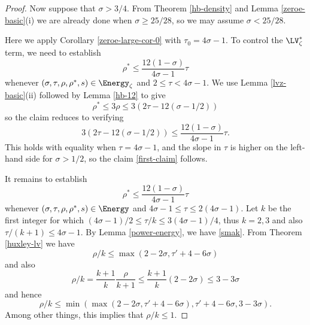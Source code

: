 \begin{proof}
Now suppose that $\sigma > 3/4$.  From Theorem \ref{hb-density} and Lemma \ref{zeroe-basic}(i) we are already done when $\sigma \geq 25/28$, so we may assume $\sigma < 25/28$.

Here we apply Corollary \ref{zeroe-large-cor-0} with $\tau_0 = 4\sigma-1$.  To control the $\LV^*_\zeta$ term, we need to establish
\begin{equation}\label{first-claim}
    \rho^* \leq \frac{12(1-\sigma)}{4\sigma-1} \tau
\end{equation}
whenever $(\sigma,\tau,\rho,\rho^*,s) \in \Energy_\zeta$ and $2 \leq \tau < 4\sigma-1$. We use Lemma \ref{lvz-basic}(ii) followed by Lemma \ref{hb-12} to give
$$ \rho^* \leq 3\rho \leq 3( 2\tau - 12 (\sigma-1/2) )$$
so the claim reduces to verifying
$$ 3( 2\tau - 12 (\sigma-1/2) ) \leq \frac{12(1-\sigma)}{4\sigma-1} \tau.$$
This holds with equality when $\tau = 4\sigma-1$, and the slope in $\tau$ is higher on the left-hand side for $\sigma>1/2$, so the claim \eqref{first-claim} follows.

It remains to establish
\begin{equation}\label{second-claim'}
    \rho^* \leq \frac{12(1-\sigma)}{4\sigma-1} \tau
\end{equation}
whenever $(\sigma,\tau,\rho,\rho^*,s) \in \Energy$ and $4\sigma-1 \leq \tau \leq 2(4\sigma-1)$.
Let $k$ be the first integer for which $(4\sigma-1)/2 \leq \tau/k \leq 3(4\sigma-1)/4$, thus $k=2,3$ and also $\tau/(k+1) \leq 4\sigma-1$.  By Lemma \ref{power-energy}, we have \eqref{smak}.
From Theorem \ref{huxley-lv} we have
$$\rho/k \leq \max(2-2\sigma, \tau' + 4 - 6\sigma)$$
and also
$$\rho/k = \frac{k+1}{k} \frac{\rho}{k+1} \leq \frac{k+1}{k} (2-2\sigma) \le 3-3\sigma$$
and hence
\begin{equation}\label{rhok} \rho/k \leq \min( \max(2-2\sigma, \tau' + 4 - 6\sigma), \tau'+4-6\sigma, 3-3\sigma).
\end{equation}
Among other things, this implies that $\rho/k \leq 1$.


\end{proof}
